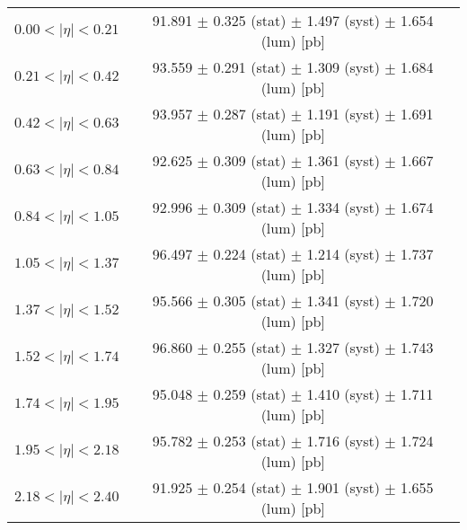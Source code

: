 \begin{tabular}{lc}
\hline
$0.00 < |\eta| <0.21$          & 91.891 $\pm$ 0.325 (stat) $\pm$ 1.497 (syst) $\pm$ 1.654 (lum) [pb]  \\
$0.21 < |\eta| <0.42$          & 93.559 $\pm$ 0.291 (stat) $\pm$ 1.309 (syst) $\pm$ 1.684 (lum) [pb]  \\
$0.42 < |\eta| <0.63$          & 93.957 $\pm$ 0.287 (stat) $\pm$ 1.191 (syst) $\pm$ 1.691 (lum) [pb]  \\
$0.63 < |\eta| <0.84$          & 92.625 $\pm$ 0.309 (stat) $\pm$ 1.361 (syst) $\pm$ 1.667 (lum) [pb]  \\
$0.84 < |\eta| <1.05$          & 92.996 $\pm$ 0.309 (stat) $\pm$ 1.334 (syst) $\pm$ 1.674 (lum) [pb]  \\
$1.05 < |\eta| <1.37$          & 96.497 $\pm$ 0.224 (stat) $\pm$ 1.214 (syst) $\pm$ 1.737 (lum) [pb]  \\
$1.37 < |\eta| <1.52$          & 95.566 $\pm$ 0.305 (stat) $\pm$ 1.341 (syst) $\pm$ 1.720 (lum) [pb]  \\
$1.52 < |\eta| <1.74$          & 96.860 $\pm$ 0.255 (stat) $\pm$ 1.327 (syst) $\pm$ 1.743 (lum) [pb]  \\
$1.74 < |\eta| <1.95$          & 95.048 $\pm$ 0.259 (stat) $\pm$ 1.410 (syst) $\pm$ 1.711 (lum) [pb]  \\
$1.95 < |\eta| <2.18$          & 95.782 $\pm$ 0.253 (stat) $\pm$ 1.716 (syst) $\pm$ 1.724 (lum) [pb]  \\
$2.18 < |\eta| <2.40$          & 91.925 $\pm$ 0.254 (stat) $\pm$ 1.901 (syst) $\pm$ 1.655 (lum) [pb]  \\
\hline
\end{tabular}
